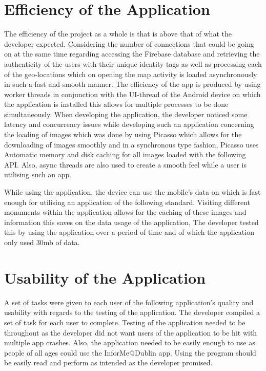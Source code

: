 \section{Efficiency of the Application}
The efficiency of the project as a whole is that is above that of what the developer expected. Considering the number of connections that could be going on at the same time regarding accessing the Firebase database and retrieving the authenticity of the users with their unique identity tags as well as processing each of the geo-locations which on opening the map activity is loaded asynchronously in such a fast and smooth manner. The efficiency of the app is produced by using worker threads in conjunction with the UI-thread of the Android device on which the application is installed this allows for multiple processes to be done simultaneously. When developing the application, the developer noticed some latency and concurrency issues while developing such an application concerning the loading of images which was done by using Picasso which allows for the downloading of images smoothly and in a synchronous type fashion, Picasso uses Automatic memory and disk caching for all images loaded with the following API. Also, async threads are also used to create a smooth feel while a user is utilising such an app. 
\par
While using the application, the device can use the mobile's data on which is fast enough for utilising an application of the following standard. Visiting different monuments within the application allows for the caching of these images and information this saves on the data usage of the application, The developer tested this by using the application over a period of time and of which the application only used 30mb of data.

\section{Usability of the Application}
A set of tasks were given to each user of the following application's quality and usability with regards to the testing of the application. The developer compiled a set of task for each user to complete. Testing of the application needed to be throughout as the developer did not want users of the application to be hit with multiple app crashes. Also, the application needed to be easily enough to use as people of all ages could use the InforMe@Dublin app. Using the program should be easily read and perform as intended as the developer promised.

